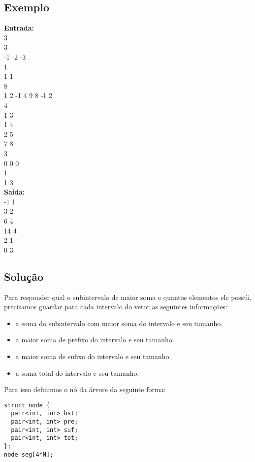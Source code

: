 \subsection{Exemplo}
\textbf{Entrada:} \\
3 \\
3 \\
-1 -2 -3 \\
1 \\
1 1 \\
8 \\
1 2 -1 4 9 8 -1 2 \\
4 \\
1 3 \\
1 4 \\
2 5 \\
7 8 \\
3 \\
0 0 0 \\
1 \\
1 3 \\

\textbf{Saída:} \\
-1 1 \\
3 2 \\
6 4 \\
14 4 \\
2 1 \\
0 3 \\

\subsection{Solução}
Para responder qual o subintervalo de maior soma e quantos elementos ele possúi, precisamos guardar para cada intervalo do vetor as seguintes informações:
\begin{itemize}
    \item a soma do subintervalo com maior soma do intervalo e seu tamanho.
    \item a maior soma de prefixo do intervalo e seu tamanho.
    \item a maior soma de sufixo do intervalo e seu tamanho.
    \item a soma total do intervalo e seu tamanho.
\end{itemize}

Para isso definimos o nó da árvore da seguinte forma:
\begin{lstlisting}
struct node {
  pair<int, int> bst;
  pair<int, int> pre;
  pair<int, int> suf;
  pair<int, int> tot;
};
node seg[4*N];
\end{lstlisting}

